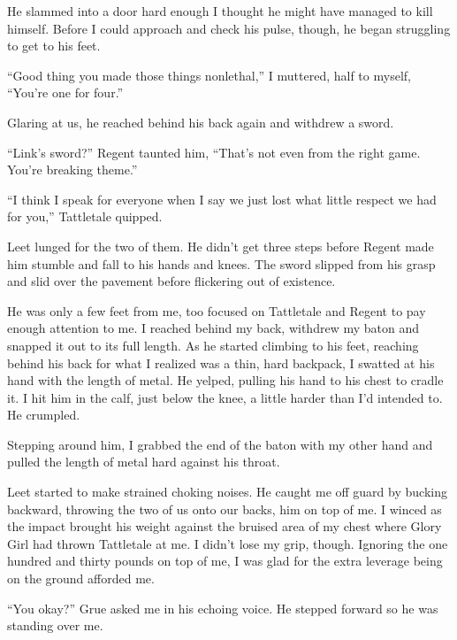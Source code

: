 He slammed into a door hard enough I thought he might have managed to kill himself.  Before I could approach and check his pulse, though, he began struggling to get to his feet.



``Good thing you made those things nonlethal,'' I muttered, half to myself, ``You're one for four.''



Glaring at us, he reached behind his back again and withdrew a sword.



``Link's sword?'' Regent taunted him, ``That's not even from the right game.  You're breaking theme.''



``I think I speak for everyone when I say we just lost what little respect we had for you,'' Tattletale quipped.



Leet lunged for the two of them.  He didn't get three steps before Regent made him stumble and fall to his hands and knees.  The sword slipped from his grasp and slid over the pavement before flickering out of existence.



He was only a few feet from me, too focused on Tattletale and Regent to pay enough attention to me.  I reached behind my back, withdrew my baton and snapped it out to its full length.  As he started climbing to his feet, reaching behind his back for what I realized was a thin, hard backpack, I swatted at his hand with the length of metal.  He yelped, pulling his hand to his chest to cradle it.  I hit him in the calf, just below the knee, a little harder than I'd intended to.  He crumpled.



Stepping around him, I grabbed the end of the baton with my other hand and pulled the length of metal hard against his throat.



Leet started to make strained choking noises.  He caught me off guard by bucking backward, throwing the two of us onto our backs, him on top of me.  I winced as the impact brought his weight against the bruised area of my chest where Glory Girl had thrown Tattletale at me.  I didn't lose my grip, though.  Ignoring the one hundred and thirty pounds on top of me, I was glad for the extra leverage being on the ground afforded me.



``You okay?'' Grue asked me in his echoing voice.  He stepped forward so he was standing over me.



